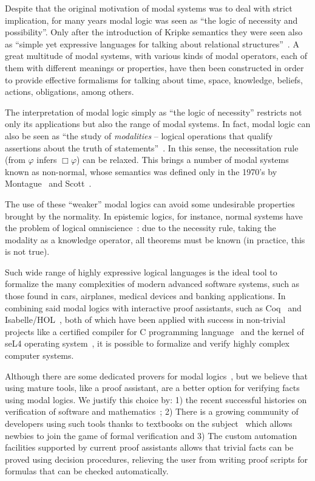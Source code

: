 \documentclass[sigconf]{acmart}
\begin{document}
Despite that the original motivation of modal systems was to deal with strict implication, 
for many years modal logic was seen as ``the logic of necessity and possibility''. 
Only after the introduction of Kripke semantics they were seen also as ``simple yet
expressive languages for talking about relational structures''~\cite{Blackburn-ModalLogics}. 
A great multitude of modal systems, with various kinds of modal operators, each of them with 
different meanings or properties, have then been constructed in order to provide effective
formalisms for talking about time, space, knowledge, beliefs, actions, 
obligations, among others.

The interpretation of modal logic simply as ``the logic of necessity'' restricts 
not only its applications but also the range of modal systems. In fact, modal logic 
can also be seen as ``the study of \emph{modalities} -- logical operations that qualify 
assertions about the truth of statements''~\cite{Goldblatt-MathofModality}. In this sense, 
the necessitation rule (from $\varphi$ infers $\Box\varphi$) can be relaxed. This brings 
a number of modal systems known as non-normal, whose semantics was defined only in the 
1970's by Montague~\cite{Montague1970} and Scott~\cite{Scott_AdviceModal1970}.

The use of these ``weaker'' modal logics can avoid some undesirable properties 
brought by the normality. In epistemic logics, for instance, normal systems 
have the problem of logical omniscience~\cite{Hocutt1972}: due to the necessity 
rule, taking the modality as a knowledge operator, all theorems must be 
known (in practice, this is not true).

Such wide range of highly expressive logical languages is the ideal tool to 
formalize the many complexities of modern advanced software systems, 
such as those found in cars, airplanes, medical devices and banking applications.
In combining said modal logics with interactive proof assistants,
such as Coq~\cite{manual_coq} and Isabelle/HOL~\cite{manual_isabelle}, both of
which have been applied with success in non-trivial projects like a certified compiler 
for C programming language~\cite{Leroy09} and the kernel of seL4 operating
system~\cite{Klein10}, it is possible to formalize and verify highly complex computer
systems.

Although there are some dedicated provers for modal logics~\cite{Gleissner17,Mora11},
but we believe that using mature tools, like a proof assistant, are a better option for
verifying facts using modal logics. We justify this choice by: 1) the recent
successful histories on verification of software and
mathematics~\cite{Leroy09,Klein10,Gonthier13,Gonthier08}; 2) There is a growing
community of developers using such tools thanks to 
textbooks on the subject~\cite{Nipkow14,Bertot10,Chlipala13} which allows
newbies to join the game of formal verification and 3) The custom automation
facilities supported by current proof assistants allows that trivial facts can
be proved using decision procedures, relieving the user from writing proof
scripts for formulas that can be checked automatically.
\end{document}
